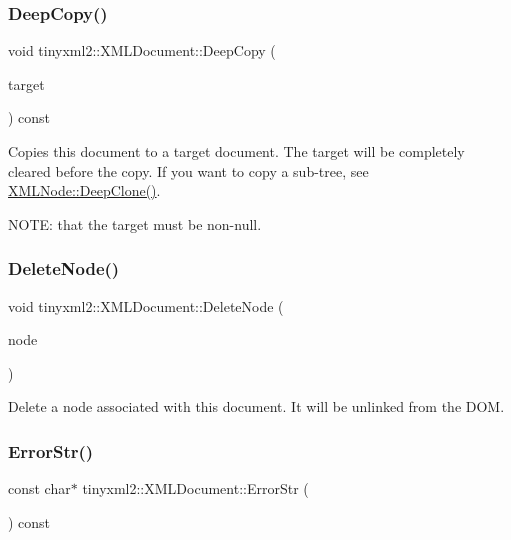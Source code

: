\subsubsection{\texorpdfstring{DeepCopy()}{DeepCopy()}}
{\footnotesize\ttfamily void tinyxml2\+::\+X\+M\+L\+Document\+::\+Deep\+Copy (\begin{DoxyParamCaption}\item[{\mbox{\hyperlink{classtinyxml2_1_1XMLDocument}{X\+M\+L\+Document}} $\ast$}]{target }\end{DoxyParamCaption}) const}

Copies this document to a target document. The target will be completely cleared before the copy. If you want to copy a sub-\/tree, see \mbox{\hyperlink{classtinyxml2_1_1XMLNode_a62c71b6bf8734b5424063b8d9a61c266}{X\+M\+L\+Node\+::\+Deep\+Clone()}}.

N\+O\+TE\+: that the \textquotesingle{}target\textquotesingle{} must be non-\/null. \mbox{\label{classtinyxml2_1_1XMLDocument_ac1d6e2c7fcc1a660624ac4f68e96380d}} 
\subsubsection{\texorpdfstring{DeleteNode()}{DeleteNode()}}
{\footnotesize\ttfamily void tinyxml2\+::\+X\+M\+L\+Document\+::\+Delete\+Node (\begin{DoxyParamCaption}\item[{\mbox{\hyperlink{classtinyxml2_1_1XMLNode}{X\+M\+L\+Node}} $\ast$}]{node }\end{DoxyParamCaption})}

Delete a node associated with this document. It will be unlinked from the D\+OM. \mbox{\label{classtinyxml2_1_1XMLDocument_ad75aa9d32c4e8b300655186808aa9abf}} 
\subsubsection{\texorpdfstring{ErrorStr()}{ErrorStr()}}
{\footnotesize\ttfamily const char$\ast$ tinyxml2\+::\+X\+M\+L\+Document\+::\+Error\+Str (\begin{DoxyParamCaption}{ }\end{DoxyParamCaption}) const}

